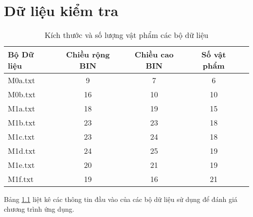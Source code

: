 \chapter{Dữ liệu kiểm tra}
\label{chap:cc}

{\scriptsize
\begin{table}[H]
    \centering
\begin{threeparttable}
   \begin{tabular}{| l | c | c | c | c ||}
			\hline
			\hline
			Bộ Dữ liệu					&	Chiều rộng BIN	& Chiều cao BIN		& Số vật phẩm\\
			\hline
			\hline
			M0a.txt 				 	&	9				&	7				& 	6\\ 
			\hline
			M0b.txt 				 	&	16				&	10				& 	10\\ 
			\hline
			M1a.txt 					&	18				&	19				& 	15\\  
			\hline
			M1b.txt 					&	23				&	23				& 	18\\  
			\hline
			M1c.txt 					&	23				&	24				& 	18\\  
			\hline
			M1d.txt 					&	24				&	25				& 	19\\  
			\hline
			M1e.txt 					&	20				&	21				& 	19\\  
			\hline
			M1f.txt 					&  	19				&	16				& 	21\\  
			\hline
		\end{tabular}
    	\caption{Kích thước và số lượng vật phẩm các bộ dữ liệu\label{tab:bpData}}
    
\end{threeparttable}
\end{table}
}%

Bảng \ref{tab:bpData} liệt kê các thông tin đầu vào của các bộ dữ liệu sử dụng để đánh giá chương trình ứng dụng.
